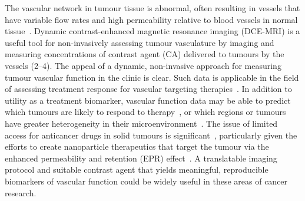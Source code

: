 The vascular network in tumour tissue is abnormal, often resulting in vessels that have variable flow rates and high permeability relative to blood vessels in normal tissue~\cite{McDonald:2002ut}.
Dynamic contrast-enhanced magnetic resonance imaging (DCE-MRI) is a useful tool for non-invasively assessing tumour vasculature by imaging and measuring concentrations of contrast agent (CA) delivered to tumours by the vessels (2–4).
The appeal of a dynamic, non-invasive approach for measuring tumour vascular function in the clinic is clear.
Such data is applicable in the field of assessing treatment response for vascular targeting therapies~\cite{OConnor:2012ie,Barrett:2006jx,Leach:2003fy}.
In addition to utility as a treatment biomarker, vascular function data may be able to predict which tumours are likely to respond to therapy~\cite{DeBruyne:2012cq,Kelly:2011cf,Bains:2009hh}, or which regions or tumours have greater heterogeneity in their microenvironment~\cite{OConnor:2011jm,Alic:2011hw}.
The issue of limited access for anticancer drugs in solid tumours is significant~\cite{Minchinton:2006gs}, particularly given the efforts to create nanoparticle therapeutics that target the tumour via the enhanced permeability and retention (EPR) effect~\cite{Jain:2001uf,Chauhan:2011fi}.
A translatable imaging protocol and suitable contrast agent that yields meaningful, reproducible biomarkers of vascular function could be widely useful in these areas of cancer research.

